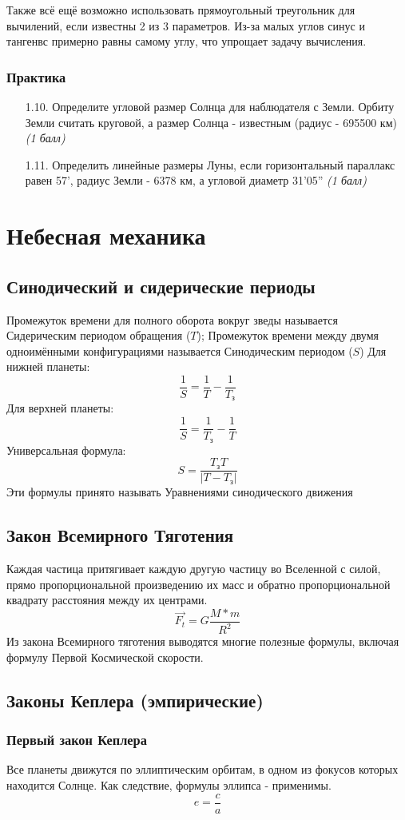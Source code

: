 \documentclass[16pt,a4paper]{report}
\begin{document}
Также всё ещё возможно использовать прямоугольный треугольник для вычилений, если известны 2 из 3 параметров. Из-за малых углов синус и тангенвс примерно равны самому углу, что упрощает задачу вычисления.
\subsection{Практика}
\begin{enumerate}
    \item [1.10.] Определите угловой размер Солнца для наблюдателя с Земли. Орбиту Земли считать круговой, а размер Солнца - известным (радиус - 695500 км) \emph{(1 балл)}
    \item [1.11.] Определить линейные размеры Луны, если горизонтальный параллакс равен 57', радиус Земли - 6378 км, а угловой диаметр 31'05'' \emph{(1 балл)}
\end{enumerate}
\chapter{Небесная механика}
\section{Синодический и сидерические периоды}
Промежуток времени для полного оборота вокруг зведы называется Сидерическим периодом обращения ($T$); Промежуток времени между двумя одноимёнными конфигурациями называется Синодическим периодом ($S$)
Для нижней планеты: $$\frac{1}{S} = \frac{1}{T} - \frac{1}{T_{\textrm{з}}}$$
Для верхней планеты: $$\frac{1}{S} = \frac{1}{T_{\textrm{з}}}-\frac{1}{T}$$
Универсальная формула: $$S = \frac{T_{\textrm{з}}T}{|T-T_{\textrm{з}}|}$$
Эти формулы принято называть Уравнениями синодического движения
\section{Закон Всемирного Тяготения}
Каждая частица притягивает каждую другую частицу во Вселенной с силой, прямо пропорциональной произведению их масс и обратно пропорциональной квадрату расстояния между их центрами.
$$\vec{F_t} = G \frac{M*m}{R^2}$$
Из закона Всемирного тяготения выводятся многие полезные формулы, включая формулу Первой Космической скорости.
\section{Законы Кеплера (эмпирические)}
\subsection{Первый закон Кеплера}
Все планеты движутся по эллиптическим орбитам, в одном из фокусов которых находится Солнце.
Как следствие, формулы эллипса - применимы. 
$$e= \frac{c}{a}$$
\end{document}
